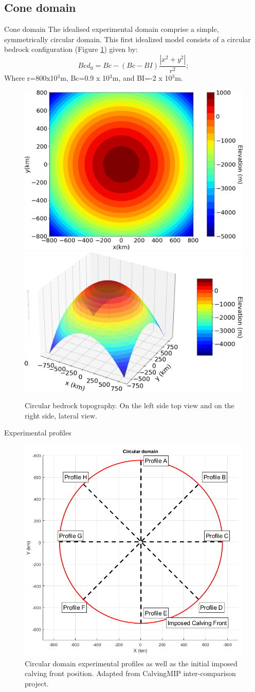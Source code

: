 \documentclass[11pt]{beamer}
\begin{document}
	\subsection{Cone domain}
		\begin{frame}{Cone domain}
		\justifying
		The idealised experimental domain comprise a simple, symmetrically circular domain. This first idealized model consists of a circular bedrock configuration (Figure \ref{circular_topo_top}) given by:
		\begin{equation}
			Bed_0=Bc-(Bc-BI)\frac{|x^2+y^2|}{r^2};
		\end{equation}
		Where r=800x10$^3$m, Bc=0.9 x 10$^3$m, and BI=-2 x 10$^3$m. 
		\begin{figure}
			\centering
			\includegraphics[width=0.45\linewidth]{../fig/circular_topo_top.png}
			\includegraphics[width=0.45\linewidth]{../fig/circular_topo_jet}
			\caption{Circular bedrock topography. On the left side top view and on the right side, lateral view.}
			\label{circular_topo_top}
		\end{figure}
		\end{frame}
		\begin{frame}{Experimental profiles}
		\begin{figure}
			\centering
			\includegraphics[width=0.5\linewidth]{../fig/cone.png}
			\caption{Circular domain experimental profiles as well as the initial imposed calving front position. Adapted from CalvingMIP inter-comparison project.}
			\label{cone_profile}
		\end{figure}
		\end{frame}
	
\end{document}
